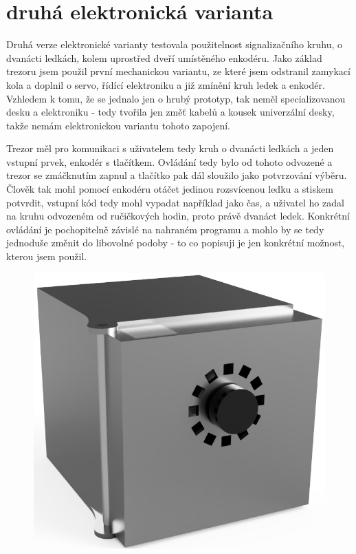 \section*{druhá elektronická varianta}

Druhá verze elektronické varianty testovala použitelnost signalizačního kruhu, o dvanácti ledkách, kolem uprostřed dveří
umístěného enkodéru. Jako základ trezoru jsem použil první mechanickou variantu, ze které jsem odstranil zamykací kola 
a doplnil o servo, řídící elektroniku a již zmínění kruh ledek a enkodér.
Vzhledem k tomu, že se jednalo jen o hrubý prototyp, tak neměl specializovanou desku a elektroniku - tedy tvořila jen změť kabelů 
a kousek univerzální desky, takže nemám elektronickou variantu tohoto zapojení. %

Trezor měl pro komunikaci s uživatelem tedy kruh o dvanácti ledkách a jeden vstupní prvek, enkodér s tlačítkem.
Ovládání tedy bylo od tohoto odvozené a trezor se zmáčknutím zapnul a tlačítko pak dál sloužilo jako potvrzování výběru.
Člověk tak mohl pomocí enkodéru otáčet jedinou rozsvícenou ledku a stiskem potvrdit, vstupní kód tedy mohl vypadat 
například jako čas, a uživatel ho zadal na kruhu odvozeném od ručičkových hodin, proto právě dvanáct ledek.
Konkrétní ovládání je pochopitelně závislé na nahraném programu a mohlo by se tedy jednoduše změnit do libovolné podoby -
to co popisuji je jen konkrétní možnost, kterou jsem použil.

\begin{figure}[htbp]
    \centering
    \includegraphics[width=\textwidth]{kapitoly/obrazky/E2/predni_render.png}
    \label{fig:M1}
\end{figure}

\newpage